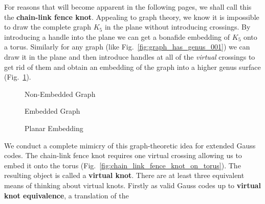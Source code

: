         For reasons that will become apparent in the following pages, we shall
        call this the \textbf{chain-link fence knot}. Appealing to graph
        theory, we know it is impossible to draw the complete graph
        $K_{5}$ in the plane without introducing crossings. By introducing a
        handle into the plane we can get a bonafide embedding of
        $K_{5}$ onto a torus. Similarly for any graph (like
        Fig.~\ref{fig:graph_has_genus_001}) we can draw it in the
        plane and then introduce handles at all of the \textit{virtual}
        crossings to get rid of them and obtain an embedding of the graph
        into a higher genus surface (Fig.~\ref{fig:graph_has_genus_002}).
        \begin{figure}
            \centering
            \begin{minipage}[b]{0.49\textwidth}
                \centering
                \caption{Non-Embedded Graph}
                \label{fig:graph_has_genus_001}
            \end{minipage}
            \hfill
            \begin{minipage}[b]{0.49\textwidth}
                \centering
                \caption{Embedded Graph}
                \label{fig:graph_has_genus_002}
            \end{minipage}
        \end{figure}
        \begin{figure}
            \centering
            \caption{Planar Embedding}
            \label{fig:graph_has_genus_003}
        \end{figure}
        \par\hfill\par
        We conduct a complete mimicry of this graph-theoretic idea for
        extended Gauss codes. The chain-link fence knot requires one
        virtual crossing allowing us to embed it onto the torus
        (Fig.~\ref{fig:chain_link_fence_knot_on_torus}). The resulting object
        is called a \textbf{virtual knot}. There are at least three equivalent
        means of thinking about virtual knots. Firstly as valid Gauss codes
        up to \textbf{virtual knot equivalence}, a translation of the
